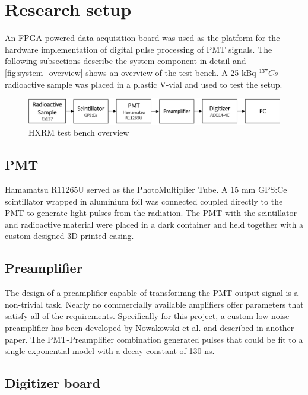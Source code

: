 \section{Research setup}

An FPGA powered data acquisition board was used as the platform 
for the hardware implementation of digital pulse processing of PMT
signals.
The following subsections describe the system component in detail and
\autoref{fig:system_overview} shows an overview of the test bench.
A 25 kBq $^137 Cs$ radioactive sample was placed in a plastic V-vial
and used to test the setup.

\begin{figure}[H]
  \centering
  \includegraphics[width=\linewidth]{media/system_overview.png}
  \caption{HXRM test bench overview}
  \label{fig:system_overview} 
\end{figure}

\subsection{PMT}

Hamamatsu R11265U served as the PhotoMultiplier Tube. 
A 15 mm GPS:Ce scintillator wrapped in aluminium foil was 
connected coupled directly to the PMT to generate light pulses
from the radiation. The PMT with the scintillator and radioactive material
were placed in a dark container and held together with a 
custom-designed 3D printed casing.

\subsection{Preamplifier}

The design of a preamplifier capable of transforimng the PMT output signal 
is a non-trivial task. Nearly no commercially available amplifiers
offer parameters that satisfy all of the requirements.
Specifically for this project, a custom low-noise preamplifier 
has been developed by Nowakowski et al. and described in another 
paper. The PMT-Preamplifier combination generated pulses that could
be fit to a single exponential model with a decay constant of 130 ns.
\cite{low_noise_amplifier_for_pmt}

\subsection{Digitizer board}

